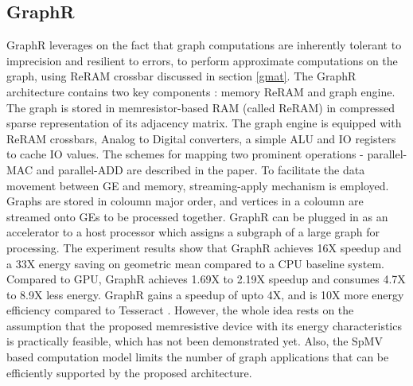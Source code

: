  \subsection{GraphR} GraphR \cite{GraphR} leverages on the fact that graph computations are inherently tolerant to imprecision and resilient to errors, to perform approximate computations on the graph, using ReRAM crossbar discussed in section \ref{gmat}. The GraphR architecture contains two key components : memory ReRAM and graph engine. The graph is stored in memresistor-based RAM (called ReRAM) in compressed sparse representation of its adjacency matrix. The graph engine is equipped with ReRAM crossbars, Analog to Digital converters, a simple ALU and IO registers to cache IO values. The schemes for mapping two prominent operations - parallel-MAC and parallel-ADD  are described in the paper. To facilitate the data movement between GE and memory, streaming-apply mechanism is employed. Graphs are stored in coloumn major order, and vertices in a coloumn are streamed onto GEs to be processed together. GraphR can be plugged in as an accelerator to a host processor which assigns a subgraph of a large graph for processing. The experiment results show that GraphR achieves 16X speedup and a 33X energy saving on geometric mean compared to a CPU baseline system. Compared to GPU, GraphR achieves 1.69X to 2.19X speedup and consumes 4.7X to 8.9X less energy. GraphR gains a speedup of upto 4X, and is 10X more energy efficiency compared to Tesseract \cite{Tesseract}. However, the whole idea rests on the assumption that the proposed memresistive device with its energy characteristics is practically feasible, which has not been demonstrated yet. Also, the SpMV based computation model limits the number of graph applications that can be efficiently supported by the proposed architecture.
 
